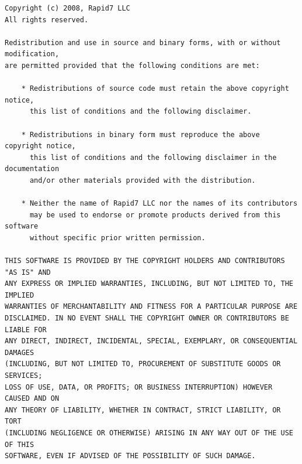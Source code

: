 \documentclass{report}
\begin{document}
{\footnotesize
\begin{verbatim}
Copyright (c) 2008, Rapid7 LLC
All rights reserved.

Redistribution and use in source and binary forms, with or without modification,
are permitted provided that the following conditions are met:

    * Redistributions of source code must retain the above copyright notice,
	  this list of conditions and the following disclaimer.

    * Redistributions in binary form must reproduce the above copyright notice,
	  this list of conditions and the following disclaimer in the documentation
	  and/or other materials provided with the distribution.

    * Neither the name of Rapid7 LLC nor the names of its contributors
	  may be used to endorse or promote products derived from this software
	  without specific prior written permission.

THIS SOFTWARE IS PROVIDED BY THE COPYRIGHT HOLDERS AND CONTRIBUTORS "AS IS" AND
ANY EXPRESS OR IMPLIED WARRANTIES, INCLUDING, BUT NOT LIMITED TO, THE IMPLIED
WARRANTIES OF MERCHANTABILITY AND FITNESS FOR A PARTICULAR PURPOSE ARE
DISCLAIMED. IN NO EVENT SHALL THE COPYRIGHT OWNER OR CONTRIBUTORS BE LIABLE FOR
ANY DIRECT, INDIRECT, INCIDENTAL, SPECIAL, EXEMPLARY, OR CONSEQUENTIAL DAMAGES
(INCLUDING, BUT NOT LIMITED TO, PROCUREMENT OF SUBSTITUTE GOODS OR SERVICES;
LOSS OF USE, DATA, OR PROFITS; OR BUSINESS INTERRUPTION) HOWEVER CAUSED AND ON
ANY THEORY OF LIABILITY, WHETHER IN CONTRACT, STRICT LIABILITY, OR TORT
(INCLUDING NEGLIGENCE OR OTHERWISE) ARISING IN ANY WAY OUT OF THE USE OF THIS
SOFTWARE, EVEN IF ADVISED OF THE POSSIBILITY OF SUCH DAMAGE.
\end{verbatim}}
\end{document}
